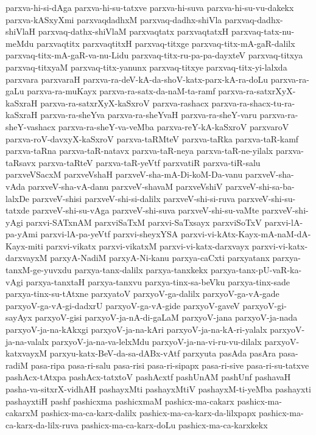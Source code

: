 {parxva-hi-si-dAga
parxva-hi-su-tatxve
parxva-hi-suva
parxva-hi-su-vu-dakekx
parxva-kASxyXmi
parxvaqdadhxM
parxvaq-dadhx-shiVla
parxvaq-dadhx-shiVlaH
parxvaq-dathx-shiVlaM
parxvaqtatx
parxvaqtatxH
parxvaq-tatx-nu-meMdu
parxvaqtitx
parxvaqtitxH
parxvaq-titxge
parxvaq-titx-mA-gaR-dalilx
parxvaq-titx-mA-gaR-va-nu-Lidu
parxvaq-titx-ru-pa-pa-dayxteV
parxvaq-titxya
parxvaq-titxyaM
parxvaq-titx-yanunx
parxvaq-titxye
parxvaq-titx-yi-lalxda
parxvara
parxvaraH
parxva-ra-deV-kA-da-shoV-katx-parx-kA-ra-doLu
parxva-ra-gaLu
parxva-ra-muKayx
parxva-ra-satx-da-naM-ta-ramf
parxva-ra-satxrXyX-kaSxraH
parxva-ra-satxrXyX-kaSxroV
parxva-rashacx
parxva-ra-shacx-tu-ra-kaSxraH
parxva-ra-sheYva
parxva-ra-sheYvaH
parxva-ra-sheY-varu
parxva-ra-sheY-vashacx
parxva-ra-sheY-va-veMba
parxva-reY-kA-kaSxroV
parxvaroV
parxva-roV-davxyX-kaSxroV
parxva-taRMteV
parxva-taRka
parxva-taR-kamf
parxva-taRna
parxva-taR-natavx
parxva-taR-neya
parxva-taR-ne-yilalx
parxva-taRsavx
parxva-taRteV
parxva-taR-yeVtf
parxvatiR
parxva-tiR-salu
parxveVSacxM
parxveVshaH
parxveV-sha-mA-Di-koM-Da-vanu
parxveV-sha-vAda
parxveV-sha-vA-danu
parxveV-shavaM
parxveVshiV
parxveV-shi-sa-ba-lalxDe
parxveV-shisi
parxveV-shi-si-dalilx
parxveV-shi-si-ruva
parxveV-shi-su-tatxde
parxveV-shi-su-vAga
parxveV-shi-suva
parxveV-shi-su-vaMte
parxveV-shi-yAgi
parxvi-SATxnAM
parxviSaTxM
parxvi-SaTxsayx
parxviSoTxV
parxvi-lA-pa-yAmi
parxvi-lA-pa-yeVtf
parxvi-sheyxYSA
parxvi-vi-kAtx-Kayx-mA-naM-dA-Kayx-miti
parxvi-vikatx
parxvi-vikatxM
parxvi-vi-katx-darxvayx
parxvi-vi-katx-darxvayxM
parxyA-NadiM
parxyA-Ni-kanu
parxya-caCxti
parxyatanx
parxya-tanxM-ge-yuvxdu
parxya-tanx-dalilx
parxya-tanxkekx
parxya-tanx-pU-vaR-ka-vAgi
parxya-tanxtaH
parxya-tanxvu
parxya-tinx-sa-beVku
parxya-tinx-sade
parxya-tinx-su-tAtxne
parxyatoV
parxyoV-ga-dalilx
parxyoV-ga-vA-gade
parxyoV-ga-vA-gi-dadxrU
parxyoV-ga-vA-gide
parxyoV-gaveV
parxyoV-gi-sayAyx
parxyoV-gisi
parxyoV-ja-nA-di-gaLaM
parxyoV-jana
parxyoV-ja-nada
parxyoV-ja-na-kAkxgi
parxyoV-ja-na-kAri
parxyoV-ja-na-kA-ri-yalalx
parxyoV-ja-na-valalx
parxyoV-ja-na-va-lelxMdu
parxyoV-ja-na-vi-ru-vu-dilalx
parxyoV-katxvayxM
parxyu-katx-BeV-da-sa-dABx-vAtf
parxyuta
pasAda
pasAra
pasa-radiM
pasa-ripa
pasa-ri-salu
pasa-risi
pasa-ri-sipapx
pasa-ri-sive
pasa-ri-su-tatxve
pashAcx-tAtxpa
pashAcx-tatxtoV
pashAcxtf
pashUnAM
pashUnf
pashavaH
pasha-va-sitxrX-vidhAH
pashayxMti
pashayxMtiV
pashayxM-ti-yeMba
pashayxti
pashayxtiH
pashf
pashicxma
pashicxmaM
pashicx-ma-cakarx
pashicx-ma-cakarxM
pashicx-ma-ca-karx-dalilx
pashicx-ma-ca-karx-da-lilxpapx
pashicx-ma-ca-karx-da-lilx-ruva
pashicx-ma-ca-karx-doLu
pashicx-ma-ca-karxkekx
}
